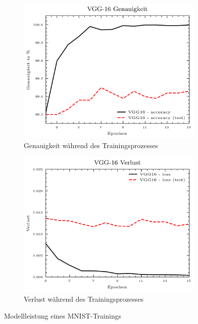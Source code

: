 \begin{figure}[H]
	\centering
	\begin{subfigure}[b]{0.35\linewidth}
		\includegraphics[width=\linewidth]{Bilder/mnist_nn_acc.png}
		\caption{Genauigkeit während des Trainingsprozesses}
		\label{img:mnist_nn_acc}
	\end{subfigure}
	\hspace{1cm} %
	\begin{subfigure}[b]{0.35\linewidth}
		\includegraphics[width=\linewidth]{Bilder/mnist_nn_loss.png}
		\caption{Verlust während des Trainingsprozesses}
		\label{img:mnist_nn_loss}
	\end{subfigure}
	\caption{Modellleistung eines MNIST-Trainings}
	\label{img:mnist_training}
\end{figure}

